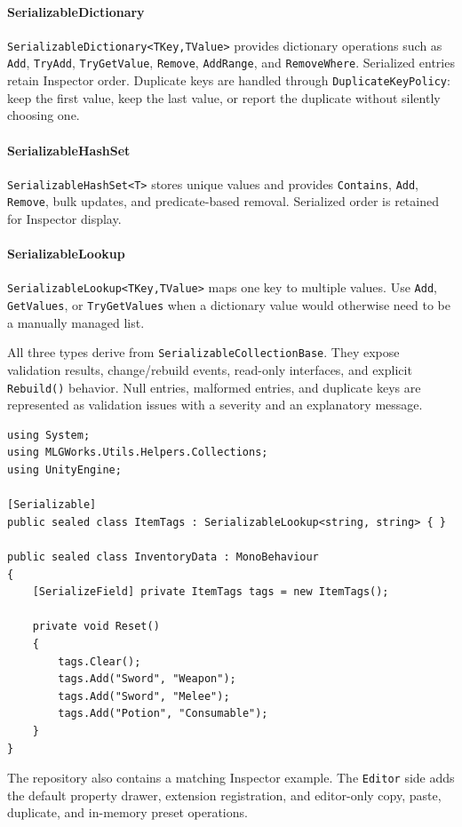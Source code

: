 \paragraph{SerializableDictionary}
\texttt{SerializableDictionary<TKey,TValue>} provides dictionary operations such as \texttt{Add}, \texttt{TryAdd}, \texttt{TryGetValue}, \texttt{Remove}, \texttt{AddRange}, and \texttt{RemoveWhere}. Serialized entries retain Inspector order. Duplicate keys are handled through \texttt{DuplicateKeyPolicy}: keep the first value, keep the last value, or report the duplicate without silently choosing one.

\paragraph{SerializableHashSet}
\texttt{SerializableHashSet<T>} stores unique values and provides \texttt{Contains}, \texttt{Add}, \texttt{Remove}, bulk updates, and predicate-based removal. Serialized order is retained for Inspector display.

\paragraph{SerializableLookup}
\texttt{SerializableLookup<TKey,TValue>} maps one key to multiple values. Use \texttt{Add}, \texttt{GetValues}, or \texttt{TryGetValues} when a dictionary value would otherwise need to be a manually managed list.

All three types derive from \texttt{SerializableCollectionBase}. They expose validation results, change/rebuild events, read-only interfaces, and explicit \texttt{Rebuild()} behavior. Null entries, malformed entries, and duplicate keys are represented as validation issues with a severity and an explanatory message.

\begin{lstlisting}
using System;
using MLGWorks.Utils.Helpers.Collections;
using UnityEngine;

[Serializable]
public sealed class ItemTags : SerializableLookup<string, string> { }

public sealed class InventoryData : MonoBehaviour
{
    [SerializeField] private ItemTags tags = new ItemTags();

    private void Reset()
    {
        tags.Clear();
        tags.Add("Sword", "Weapon");
        tags.Add("Sword", "Melee");
        tags.Add("Potion", "Consumable");
    }
}
\end{lstlisting}

The repository also contains a matching Inspector example. The \texttt{Editor} side adds the default property drawer, extension registration, and editor-only copy, paste, duplicate, and in-memory preset operations.
